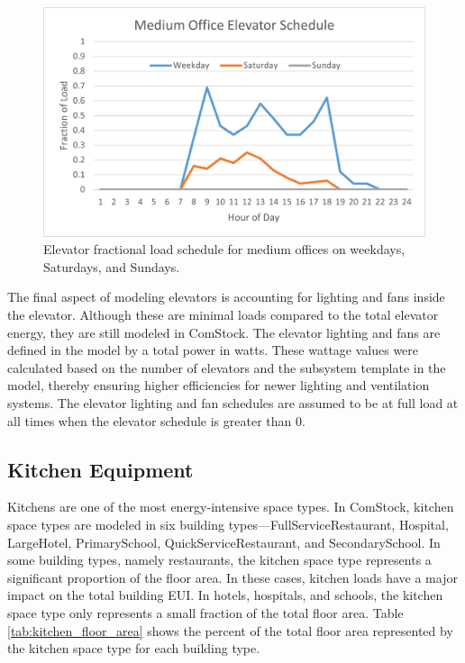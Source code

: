 \begin{figure}[ht!]
    \centering 
    \includegraphics[]{figures/medium_office_elevator.png}
    \caption[Medium office elevator schedule]{Elevator fractional load schedule for medium offices on weekdays, Saturdays, and Sundays.}
    \label{fig:medium_office_elevator_schedule}
\end{figure}

The final aspect of modeling elevators is accounting for lighting and fans inside the elevator. Although these are minimal loads compared to the total elevator energy, they are still modeled in ComStock. The elevator lighting and fans are defined in the model by a total power in watts. These wattage values were calculated based on the number of elevators and the subsystem template in the model, thereby ensuring higher efficiencies for newer lighting and ventilation systems. The elevator lighting and fan schedules are assumed to be at full load at all times when the elevator schedule is greater than 0.

\pagebreak

\subsection{Kitchen Equipment} 
Kitchens are one of the most energy-intensive space types. In ComStock, kitchen space types are modeled in six building types---FullServiceRestaurant, Hospital, LargeHotel, PrimarySchool, QuickServiceRestaurant, and SecondarySchool. In some building types, namely restaurants, the kitchen space type represents a significant proportion of the floor area. In these cases, kitchen loads have a major impact on the total building EUI. In hotels, hospitals, and schools, the kitchen space type only represents a small fraction of the total floor area. Table \ref{tab:kitchen_floor_area} shows the percent of the total floor area represented by the kitchen space type for each building type.


